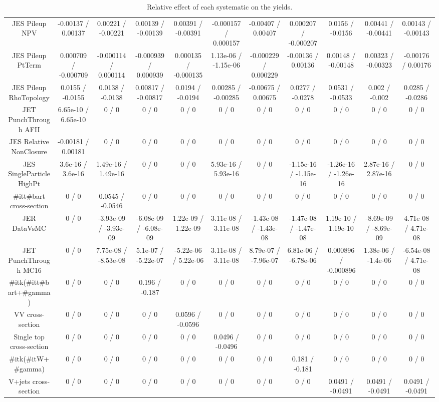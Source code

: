 \begin{table}[htbp]
\begin{center}
\begin{tabular}{|c|c|c|c|c|c|c|c|c|c|c|}
  JES Pileup NPV & -0.00137 / 0.00137 & 0.00221 / -0.00221 & 0.00139 / -0.00139 & 0.00391 / -0.00391 & -0.000157 / 0.000157 & -0.00407 / 0.00407 & 0.000207 / -0.000207 & 0.0156 / -0.0156 & 0.00441 / -0.00441 & 0.00143 / -0.00143 \\ 
  JES Pileup PtTerm & 0.000709 / -0.000709 & -0.000114 / 0.000114 & -0.000939 / 0.000939 & 0.000135 / -0.000135 & 1.13e-06 / -1.15e-06 & -0.000229 / 0.000229 & -0.00136 / 0.00136 & 0.00148 / -0.00148 & 0.00323 / -0.00323 & -0.00176 / 0.00176 \\ 
  JES Pileup RhoTopology & 0.0155 / -0.0155 & 0.0138 / -0.0138 & 0.00817 / -0.00817 & 0.0194 / -0.0194 & 0.00285 / -0.00285 & -0.00675 / 0.00675 & 0.0277 / -0.0278 & 0.0531 / -0.0533 & 0.002 / -0.002 & 0.0285 / -0.0286 \\ 
  JET PunchThrough AFII & 6.65e-10 / 6.65e-10 & 0 / 0 & 0 / 0 & 0 / 0 & 0 / 0 & 0 / 0 & 0 / 0 & 0 / 0 & 0 / 0 & 0 / 0 \\ 
  JES Relative NonClosure & -0.00181 / 0.00181 & 0 / 0 & 0 / 0 & 0 / 0 & 0 / 0 & 0 / 0 & 0 / 0 & 0 / 0 & 0 / 0 & 0 / 0 \\ 
  JES SingleParticle HighPt & 3.6e-16 / 3.6e-16 & 1.49e-16 / 1.49e-16 & 0 / 0 & 0 / 0 & 5.93e-16 / 5.93e-16 & 0 / 0 & -1.15e-16 / -1.15e-16 & -1.26e-16 / -1.26e-16 & 2.87e-16 / 2.87e-16 & 0 / 0 \\ 
  #it{t#bar{t}} cross-section & 0 / 0 & 0.0545 / -0.0546 & 0 / 0 & 0 / 0 & 0 / 0 & 0 / 0 & 0 / 0 & 0 / 0 & 0 / 0 & 0 / 0 \\ 
  JER DataVsMC & 0 / 0 & -3.93e-09 / -3.93e-09 & -6.08e-09 / -6.08e-09 & 1.22e-09 / 1.22e-09 & 3.11e-08 / 3.11e-08 & -1.43e-08 / -1.43e-08 & -1.47e-08 / -1.47e-08 & 1.19e-10 / 1.19e-10 & -8.69e-09 / -8.69e-09 & 4.71e-08 / 4.71e-08 \\ 
  JET PunchThrough MC16 & 0 / 0 & 7.75e-08 / -8.53e-08 & 5.1e-07 / -5.22e-07 & -5.22e-06 / 5.22e-06 & 3.11e-08 / 3.11e-08 & 8.79e-07 / -7.96e-07 & 6.81e-06 / -6.78e-06 & 0.000896 / -0.000896 & 1.38e-06 / -1.4e-06 & -6.54e-08 / 4.71e-08 \\ 
  #it{k}(#it{t#bar{t}+#gamma}) & 0 / 0 & 0 / 0 & 0.196 / -0.187 & 0 / 0 & 0 / 0 & 0 / 0 & 0 / 0 & 0 / 0 & 0 / 0 & 0 / 0 \\ 
  VV cross-section & 0 / 0 & 0 / 0 & 0 / 0 & 0.0596 / -0.0596 & 0 / 0 & 0 / 0 & 0 / 0 & 0 / 0 & 0 / 0 & 0 / 0 \\ 
  Single top cross-section & 0 / 0 & 0 / 0 & 0 / 0 & 0 / 0 & 0.0496 / -0.0496 & 0 / 0 & 0 / 0 & 0 / 0 & 0 / 0 & 0 / 0 \\ 
  #it{k}(#it{W+#gamma}) & 0 / 0 & 0 / 0 & 0 / 0 & 0 / 0 & 0 / 0 & 0 / 0 & 0.181 / -0.181 & 0 / 0 & 0 / 0 & 0 / 0 \\ 
  V+jets cross-section & 0 / 0 & 0 / 0 & 0 / 0 & 0 / 0 & 0 / 0 & 0 / 0 & 0 / 0 & 0.0491 / -0.0491 & 0.0491 / -0.0491 & 0.0491 / -0.0491 \\ 
\hline 
\end{tabular} 
\caption{Relative effect of each systematic on the yields.} 
\end{center} 
\end{table} 
